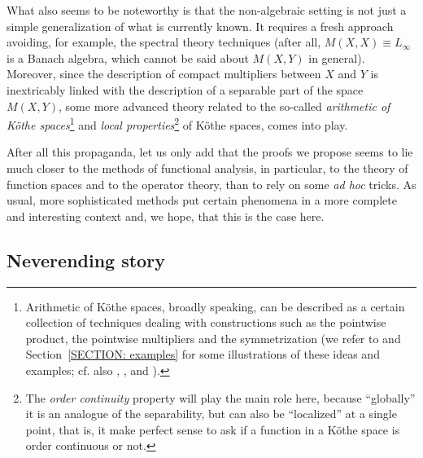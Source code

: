 \documentclass[11pt]{amsart}
\theoremstyle{definition}
\theoremstyle{definition}
\theoremstyle{definition}
\theoremstyle{definition}
\theoremstyle{definition}
\theoremstyle{definition}
\theoremstyle{definition}
\theoremstyle{definition}
\numberwithin{equation}{section}
\numberwithin{equation}{section}
\numberwithin{equation}{section}
\theoremstyle{definition}
\theoremstyle{definition}
\theoremstyle{definition}
\theoremstyle{definition}
\theoremstyle{definition}
\theoremstyle{definition}
\begin{document}
What also seems to be noteworthy is that the non-algebraic setting is not just a simple generalization of what is currently known.
It requires a fresh approach avoiding, for example, the spectral theory techniques (after all, $M(X,X) \equiv L_{\infty}$
is a Banach algebra, which cannot be said about $M(X,Y)$ in general). Moreover, since the description of compact multipliers between
$X$ and $Y$ is inextricably linked with the description of a separable part of the space $M(X,Y)$, some more advanced theory related
to the so-called {\it arithmetic of K{\" o}the spaces}\footnote{Arithmetic of K{\" o}the spaces, broadly speaking, can be described as a certain collection
of techniques dealing with constructions such as the pointwise product, the pointwise multipliers and the symmetrization (we refer to \cite{KLM19} and Section~\ref{SECTION: examples}
for some illustrations of these ideas and examples; cf. also \cite{CS14}, \cite{CDSP08}, \cite{KLM12, KLM14} and \cite{Sch10}).}
and {\it local properties}\footnote{The {\it order continuity} property will play the main role here, because \enquote{globally} it is an analogue
of the separability, but can also be \enquote{localized} at a single point, that is, it make perfect sense to ask if a function in a K{\" o}the space
is order continuous or not.} of K{\" o}the spaces, comes into play.

After all this propaganda, let us only add that the proofs we propose seems to lie much closer to the methods of functional analysis, in particular,
to the theory of function spaces and to the operator theory, than to rely on some {\it ad hoc} tricks. As usual, more sophisticated methods put certain
phenomena in a more complete and interesting context and, we hope, that this is the case here.

\subsection{Neverending story} \label{SECTION: Neverending Story}
\end{document}
